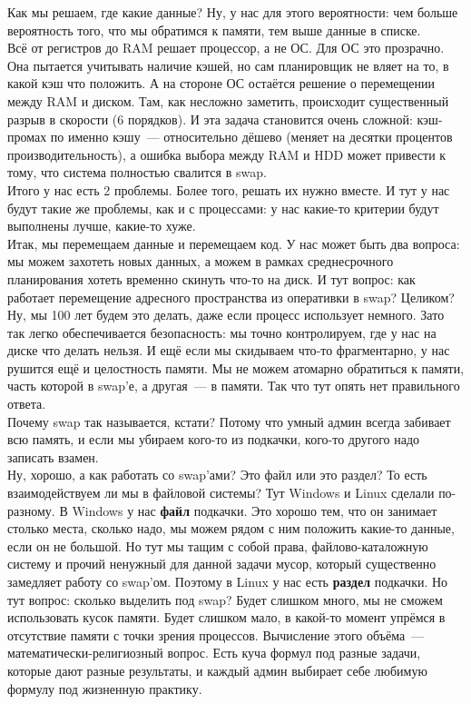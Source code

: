 \documentclass{article}
\begin{document}
    Как мы решаем, где какие данные? Ну, у нас для этого вероятности: чем больше вероятность того, что мы обратимся к памяти, тем выше данные в списке.\\
    Всё от регистров до RAM решает процессор, а не ОС. Для ОС это прозрачно. Она пытается учитывать наличие кэшей, но сам планировщик не вляет на то, в какой кэш что положить. А на стороне ОС остаётся решение о перемещении между RAM и диском. Там, как несложно заметить, происходит существенный разрыв в скорости (6 порядков). И эта задача становится очень сложной: кэш-промах по именно кэшу~--- относительно дёшево (меняет на десятки процентов производительность), а ошибка выбора между RAM и HDD может привести к тому, что система полностью свалится в swap.\\
    Итого у нас есть 2 проблемы. Более того, решать их нужно вместе. И тут у нас будут такие же проблемы, как и с процессами: у нас какие-то критерии будут выполнены лучше, какие-то хуже.\\
    Итак, мы перемещаем данные и перемещаем код. У нас может быть два вопроса: мы можем захотеть новых данных, а можем в рамках среднесрочного планирования хотеть временно скинуть что-то на диск. И тут вопрос: как работает перемещение адресного пространства из оперативки в swap? Целиком? Ну, мы 100 лет будем это делать, даже если процесс использует немного. Зато так легко обеспечивается безопасность: мы точно контролируем, где у нас на диске что делать нельзя. И ещё если мы скидываем что-то фрагментарно, у нас рушится ещё и целостность памяти. Мы не можем атомарно обратиться к памяти, часть которой в swap'е, а другая~--- в памяти. Так что тут опять нет правильного ответа.\\
    Почему swap так называется, кстати? Потому что умный админ всегда забивает всю память, и если мы убираем кого-то из подкачки, кого-то другого надо записать взамен.\\
    Ну, хорошо, а как работать со swap'ами? Это файл или это раздел? То есть взаимодействуем ли мы в файловой системы? Тут Windows и Linux сделали по-разному. В Windows у нас \textbf{файл} подкачки. Это хорошо тем, что он занимает столько места, сколько надо, мы можем рядом с ним положить какие-то данные, если он не большой. Но тут мы тащим с собой права, файлово-каталожную систему и прочий ненужный для данной задачи мусор, который существенно замедляет работу со swap'ом. Поэтому в Linux у нас есть \textbf{раздел} подкачки. Но тут вопрос: сколько выделить под swap? Будет слишком много, мы не сможем использовать кусок памяти. Будет слишком мало, в какой-то момент упрёмся в отсутствие памяти с точки зрения процессов. Вычисление этого объёма~--- математически-религиозный вопрос. Есть куча формул под разные задачи, которые дают разные результаты, и каждый админ выбирает себе любимую формулу под жизненную практику.\\
\end{document}
